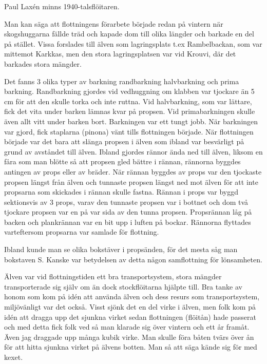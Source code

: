 Paul Laxén  minns 1940-talsflöitaren.

Man kan säga att flottningens förarbete började redan på vintern när skogshuggarna fällde träd och kapade dom till olika längder och barkade en del på stället. Vissa forslades till älven som lagringsplats t.ex Rambelbackan, som var mittemot Karkkas, men den stora lagringsplatsen var vid Krouvi, där det barkades stora mängder.

Det fanns 3 olika typer av barkning randbarkning halvbarkning och prima barkning. Randbarkning gjordes vid vedhuggning om klabben var tjockare än 5 cm för att den skulle torka och inte ruttna. Vid halvbarkning, som var lättare, fick det vita under barken lämnas kvar på propsen. Vid primabarkningen skulle även allt vitt under barken bort. Barkningen var ett tungt jobb. När barkningen var gjord, fick staplarna (pinona) vänt tills flottningen började. När flottningen började var det bara att slänga propsen i älven som ibland var besvärligt på grund av avståndet till älven. Ibland gjordes rännor ända ned till älven, liksom en fåra som man blötte så att propsen gled bättre i rännan, rännorna byggdes antingen av props eller av bräder. När rännan byggdes av props var den tjockaste propsen längst från älven och tunnaste propsen längst ned mot älven för att inte propsarna som skickades i rännan skulle fastna. Rännan i props var byggd sektionsvis av 3 props, varav den tunnaste propsen var i bottnet och dom två tjockare propsen var en på var sida av den tunna propsen. Propsrännan låg på backen och plankrännan var en bit upp i luften på bockar. Rännorna flyttades varteftersom propsarna var samlade för flottning.

Ibland kunde man se olika bokstäver i propsänden, för det mesta såg man bokstaven S. Kanske var betydelsen av detta någon samflottning för lönsamheten.


Älven var vid flottningstiden ett bra transportsystem, stora mängder transporterade sig själv om än dock stockflöitarna hjälpte till. Bra tanke av honom som kom på idén att använda älven och dess resurs som transportsystem, miljövänligt var det också. Visst sjönk det en del virke i älven, men folk kom på idén att dragga upp det sjunkna virket sedan flottningen (flöitån) hade passerat och med detta fick folk ved så man klarade sig över vintern och ett år framåt. Även jag draggade upp många kubik virke. Man skulle föra båten tvärs över ån för att hitta sjunkna virket på älvens botten. Man så att säga kände sig för med kexet.

